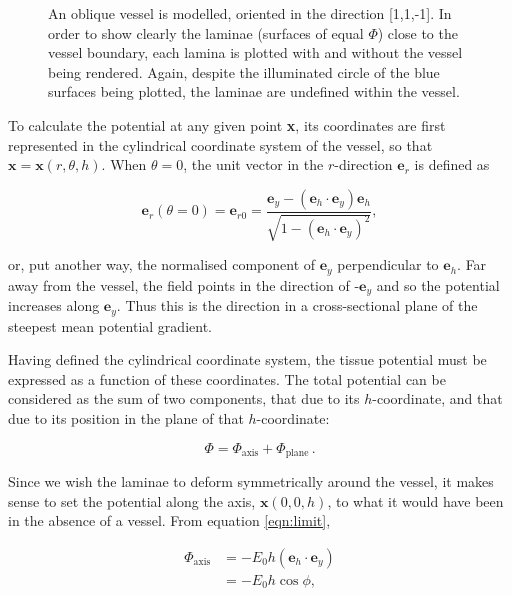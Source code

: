 \begin{figure}[htbp]
    \caption{An oblique vessel is modelled, oriented in the direction [1,1,-1]. In order to show clearly the laminae (surfaces of equal $\Phi$) close to the vessel boundary, each lamina is plotted with and without the vessel being rendered. Again, despite the illuminated circle of the blue surfaces being plotted, the laminae are undefined within the vessel.}
    \label{fig:oblique}
  \end{figure}
  
  To calculate the potential at any given point \textbf{x}, its coordinates are first represented in the cylindrical coordinate system of the vessel, so that $\mathbf{x} = \mathbf{x}(r,\theta,h)$. When $\theta = 0$, the unit vector in the $r$-direction $\mathbf{e}_r$ is defined as
  
  \begin{equation}
    \mathbf{e}_r(\theta = 0) =  \mathbf{e}_{r0} = \frac{\mathbf{e}_y - (\mathbf{e}_h \cdot \mathbf{e}_y) \mathbf{e}_h}{\sqrt{1 - \left(\mathbf{e}_h \cdot \mathbf{e}_y\right)^2}},
  \end{equation}
  
  or, put another way, the normalised component of $\mathbf{e}_y$ perpendicular to $\mathbf{e}_h$. Far away from the vessel, the field points in the direction of -$\mathbf{e}_y$ and so the potential increases along $\mathbf{e}_y$. Thus this is the direction in a cross-sectional plane of the steepest mean potential gradient.
  
  Having defined the cylindrical coordinate system, the tissue potential must be expressed as a function of these coordinates. The total potential can be considered as the sum of two components, that due to its $h$-coordinate, and that due to its position in the plane of that $h$-coordinate:
  
  \begin{equation}
    \Phi = \Phi_{\text{axis}} + \Phi_{\text{plane}}\,.
  \end{equation}
  
  Since we wish the laminae to deform symmetrically around the vessel, it makes sense to set the potential along the axis, $\mathbf{x}(0,0,h)$, to what it would have been in the absence of a vessel. From equation \ref{eqn:limit},
  
  \begin{align}
    \Phi_{\text{axis}} & = -E_0h(\mathbf{e}_h \cdot \mathbf{e}_y) \\
    & = -E_0h\cos\phi,
  \end{align}
  
